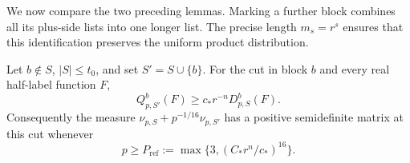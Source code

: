 We now compare the two preceding lemmas.  Marking a further block
combines all its plus-side lists into one longer list.  The precise
length \(m_s=r^s\) ensures that this identification preserves the
uniform product distribution.

\begin{lemma}
\label{lem:tuple-marking-domination}
Let \(b\notin S\), \(|S|\le t_0\), and set
\(S'=S\cup\{b\}\).  For the cut in block \(b\) and every real
half-label function \(F\),
\begin{equation}
 Q_{p,S'}^{b}(F)\ge c_*r^{-n}D_{p,S}^{b}(F).
 \label{eq:tuple-marking-domination}
\end{equation}
Consequently the measure
\(\nu_{p,S}+p^{-1/16}\nu_{p,S'}\) has a positive semidefinite
matrix at this cut whenever
\begin{equation}
 p\ge P_{\mathrm{ref}}
 :=\max\{3,(C_*r^n/c_*)^{16}\}.
 \label{eq:tuple-reflection-threshold}
\end{equation}
\end{lemma}

